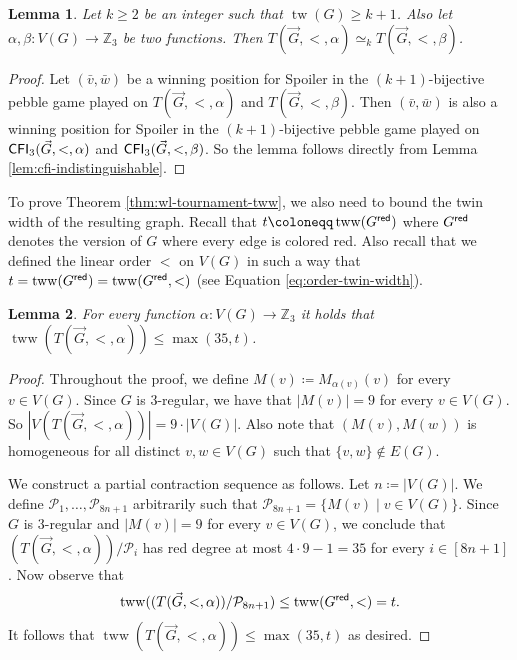 \PassOptionsToPackage{dvipsnames,svgnames}{xcolor}\documentclass[10pt,a4paper]{article}
\newtheorem{lemma}{Lemma}[section]
\newcommand{\CP}{{\mathcal P}}
\newcommand{\ZZ}{{\mathbb Z}}
\newcommand{\red}{{\sf red}}
\DeclareMathOperator{\tw}{tw}
\DeclareMathOperator{\tww}{tww}
\newcommand{\CFI}{{\sf CFI}}
\begin{document}
\begin{lemma}
 \label{lem:cfi-tournament-indistinguishable}
 Let $k \geq 2$ be an integer such that $\tw(G) \geq k+1$.
 Also let $\alpha,\beta\colon V(G) \to \ZZ_3$ be two functions.
 Then $T(\vec{G},<,\alpha) \simeq_k T(\vec{G},<,\beta)$.
\end{lemma}

\begin{proof}
 Let $(\bar v,\bar w)$ be a winning position for Spoiler in the $(k+1)$-bijective pebble game played on $T(\vec{G},<,\alpha)$ and $T(\vec{G},<,\beta)$.
 Then $(\bar v,\bar w)$ is also a winning position for Spoiler in the $(k+1)$-bijective pebble game played on $\CFI_3(\vec{G},<,\alpha)$ and $\CFI_3(\vec{G},<,\beta)$.
 So the lemma follows directly from Lemma \ref{lem:cfi-indistinguishable}.
\end{proof}

To prove Theorem \ref{thm:wl-tournament-tww}, we also need to bound the twin width of the resulting graph.
Recall that $t \coloneqq \tww(G^{\red})$ where $G^{\red}$ denotes the version of $G$ where every edge is colored red.
Also recall that we defined the linear order $<$ on $V(G)$ in such a way that $t = \tww(G^{\red}) = \tww(G^{\red},<)$ (see Equation \eqref{eq:order-twin-width}).

\begin{lemma}
 \label{lem:tww-cfi-tournament}
 For every function $\alpha\colon V(G) \to \ZZ_3$ it holds that $\tww(T(\vec{G},<,\alpha)) \leq \max(35,t)$.
\end{lemma}

\begin{proof}
 Throughout the proof, we define $M(v) \coloneqq M_{\alpha(v)}(v)$ for every $v \in V(G)$.
 Since $G$ is $3$-regular, we have that $|M(v)| = 9$ for every $v \in V(G)$.
 So $|V(T(\vec{G},<,\alpha))| = 9 \cdot |V(G)|$.
 Also note that $(M(v),M(w))$ is homogeneous for all distinct $v,w \in V(G)$ such that $\{v,w\} \notin E(G)$.

 We construct a partial contraction sequence as follows.
 Let $n \coloneqq |V(G)|$.
 We define $\CP_1,\dots,\CP_{8n+1}$ arbitrarily such that $\CP_{8n+1} = \{M(v) \mid v \in V(G)\}$.
 Since $G$ is $3$-regular and $|M(v)| = 9$ for every $v \in V(G)$, we conclude that $(T(\vec{G},<,\alpha))/\CP_i$ has red degree at most $4 \cdot 9 - 1 = 35$ for every $i \in [8n+1]$.
 Now observe that
 \[\tww((T(\vec{G},<,\alpha))/\CP_{8n+1}) \leq \tww(G^{\red},<) = t.\]
 It follows that $\tww(T(\vec{G},<,\alpha)) \leq \max(35,t)$ as desired.
\end{proof}
\end{document}

